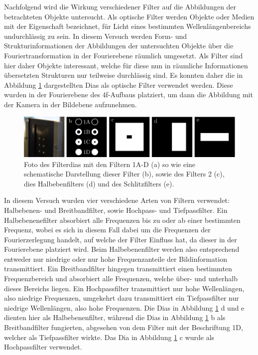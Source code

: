 Nachfolgend wird die Wirkung verschiedener Filter auf die Abbildungen der betrachteten Objekte untersucht. Als optische Filter werden Objekte oder Medien mit der Eigenschaft bezeichnet, für Licht eines bestimmten Wellenlängenbereichs undurchlässig zu sein. In diesem Versuch werden Form- und Strukturinformationen der Abbildungen der untersuchten Objekte über die Fouriertransformation in der Fourierebene räumlich umgesetzt. Als Filter sind hier daher Objekte interessant, welche für diese nun in räumliche Informationen übersetzten Strukturen nur teilweise durchlässig sind. Es konnten daher die in Abbildung \ref{fig:filter} dargestellten Dias als optische Filter verwendet werden. Diese wurden in der Fourierebene des 4f-Aufbaus platziert, um dann die Abbildung mit der Kamera in der Bildebene aufzunehmen.

\begin{figure}[h]
	\centering
	\includegraphics{images/filter/abb.pdf}
	\caption[Verwendete Filter]{
		Foto des Filterdias mit den Filtern 1A-D (a) so wie eine schematische Darstellung dieser Filter (b), sowie des Filters 2 (c), dies Halbebenfilters (d) und des Schlitzfilters (e).
	}
	\label{fig:filter}
\end{figure}

In diesem Versuch wurden vier verschiedene Arten von Filtern verwendet: Halbebenen- und Breitbandfilter, sowie Hochpass- und Tiefpassfilter. Ein Halbebenenefilter absorbiert alle Frequenzen bis zu oder ab einer bestimmten Frequenz, wobei es sich in diesem Fall dabei um die Frequenzen der Fourierzerlegung handelt, auf welche der Filter Einfluss hat, da dieser in der Fourierebene platziert wird. Beim Halbebenenfilter werden also entsprechend entweder nur niedrige oder nur hohe Frequenzanteile der Bildinformation transmittiert. Ein Breitbandfilter hingegen transmittiert einen bestimmten Frequenzbereich und absorbiert alle Frequenzen, welche über- und unterhalb dieses Bereichs liegen. Ein Hochpassfilter transmittiert nur hohe Wellenlängen, also niedrige Frequenzen, umgekehrt dazu transmittiert ein Tiefpassfilter nur niedrige Wellenlängen, also hohe Frequenzen. Die Dias in Abbildung \ref{fig:filter} d und e dienten hier als Halbebenenfilter, während die Dias in Abbildung \ref{fig:filter} b als Breitbandfilter fungierten, abgesehen von dem Filter mit der Beschriftung 1D, welcher als Tiefpassfilter wirkte. Das Dia in Abbildung \ref{fig:filter} c wurde als Hochpassfilter verwendet. 

